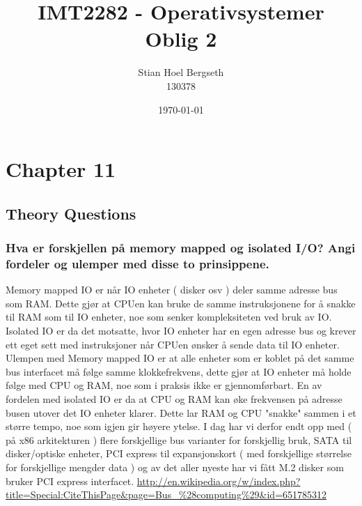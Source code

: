 \documentclass[9pt]{article}
\title{IMT2282 - Operativsystemer \\
	Oblig 2}
\author{Stian Hoel Bergseth \\
	130378}
\date{\today}
\begin{document}
\maketitle

\section{Chapter 11}
\setcounter{subsection}{5}
\subsection{Theory Questions}
\subsubsection{Hva er forskjellen på memory mapped og isolated I/O? Angi fordeler og ulemper med disse to prinsippene.}

Memory mapped IO er når IO enheter ( disker osv ) deler samme adresse bus som RAM. Dette gjør at CPUen kan bruke de samme instruksjonene for å snakke til RAM som til IO enheter, noe som senker kompleksiteten ved bruk av IO. Isolated IO er da det motsatte, hvor IO enheter har en egen adresse bus og krever ett eget sett med instruksjoner når CPUen ønsker å sende data til IO enheter. Ulempen med Memory mapped IO er at alle enheter som er koblet på det samme bus interfacet må følge samme klokkefrekvens, dette gjør at IO enheter må holde følge med CPU og RAM, noe som i praksis ikke er gjennomførbart. En av fordelen med isolated IO er da at CPU og RAM kan øke frekvensen på adresse busen utover det IO enheter klarer. Dette lar RAM og CPU "snakke" sammen i et større tempo, noe som igjen gir høyere ytelse. 
I dag har vi derfor endt opp med ( på x86 arkitekturen ) flere forskjellige bus varianter for forskjellig bruk, SATA til disker/optiske enheter, PCI express til expansjonskort ( med forskjellige størrelse for forskjellige mengder data ) og av det aller nyeste har vi fått M.2 disker som bruker PCI express interfacet.  \url{http://en.wikipedia.org/w/index.php?title=Special:CiteThisPage&page=Bus_%28computing%29&id=651785312}
\end{document}
